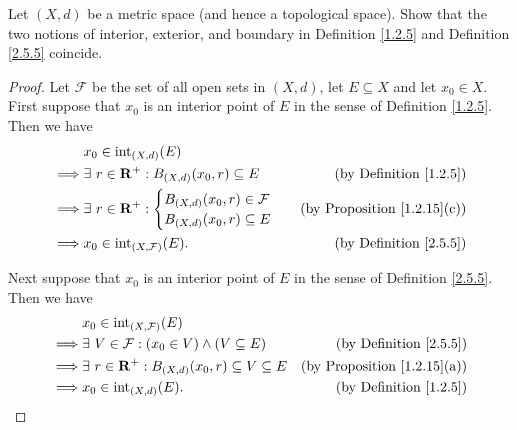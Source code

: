 \begin{exercise}\label{ex 2.5.3}
    Let \((X, d)\) be a metric space (and hence a topological space).
    Show that the two notions of interior, exterior, and boundary in Definition
    \ref{1.2.5} and Definition \ref{2.5.5} coincide.
\end{exercise}

\begin{proof}
    Let \(\mathcal{F}\) be the set of all open sets in \((X, d)\), let \(E \subseteq X\) and let \(x_0 \in X\).
    First suppose that \(x_0\) is an interior point of \(E\) in the sense of Definition \ref{1.2.5}.
    Then we have
    \begin{align*}
                 & x_0 \in \text{int}_{(X, d)}(E)                                                                         \\
        \implies & \exists\ r \in \mathbf{R}^+ : B_{(X, d)}(x_0, r) \subseteq E & \text{(by Definition \ref{1.2.5})}      \\
        \implies & \exists\ r \in \mathbf{R}^+ : \begin{cases}
            B_{(X, d)}(x_0, r) \in \mathcal{F} \\
            B_{(X, d)}(x_0, r) \subseteq E
        \end{cases}     & \text{(by Proposition \ref{1.2.15}(c))} \\
        \implies & x_0 \in \text{int}_{(X, \mathcal{F})}(E).                    & \text{(by Definition \ref{2.5.5})}
    \end{align*}

    Next suppose that \(x_0\) is an interior point of \(E\) in the sense of Definition \ref{2.5.5}.
    Then we have
    \begin{align*}
                 & x_0 \in \text{int}_{(X, \mathcal{F})}(E)                                                                           \\
        \implies & \exists\ V \in \mathcal{F} : (x_0 \in V) \land (V \subseteq E)           & \text{(by Definition \ref{2.5.5})}      \\
        \implies & \exists\ r \in \mathbf{R}^+ : B_{(X, d)}(x_0, r) \subseteq V \subseteq E & \text{(by Proposition \ref{1.2.15}(a))} \\
        \implies & x_0 \in \text{int}_{(X, d)}(E).                                          & \text{(by Definition \ref{1.2.5})}
    \end{align*}


\end{proof}
